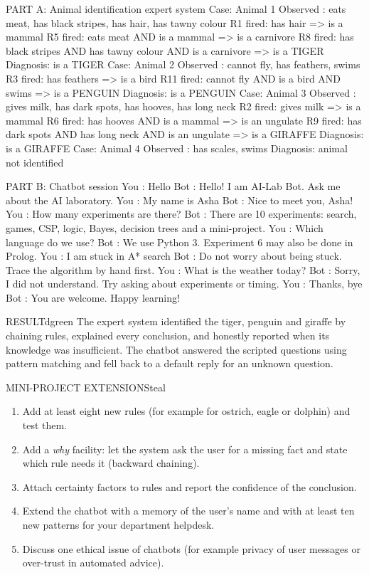 \documentclass[11pt,a4paper]{article}
\newenvironment{result}{\begin{secbox}{RESULT}{dgreen}}{\end{secbox}}
\begin{document}
\begin{outputbox}
PART A: Animal identification expert system
Case: Animal 1
   Observed : eats meat, has black stripes, has hair, has tawny colour
   R1  fired: has hair => is a mammal
   R5  fired: eats meat AND is a mammal => is a carnivore
   R8  fired: has black stripes AND has tawny colour AND is a carnivore => is a TIGER
   Diagnosis: is a TIGER
Case: Animal 2
   Observed : cannot fly, has feathers, swims
   R3  fired: has feathers => is a bird
   R11 fired: cannot fly AND is a bird AND swims => is a PENGUIN
   Diagnosis: is a PENGUIN
Case: Animal 3
   Observed : gives milk, has dark spots, has hooves, has long neck
   R2  fired: gives milk => is a mammal
   R6  fired: has hooves AND is a mammal => is an ungulate
   R9  fired: has dark spots AND has long neck AND is an ungulate => is a GIRAFFE
   Diagnosis: is a GIRAFFE
Case: Animal 4
   Observed : has scales, swims
   Diagnosis: animal not identified

PART B: Chatbot session
   You : Hello
   Bot : Hello! I am AI-Lab Bot. Ask me about the AI laboratory.
   You : My name is Asha
   Bot : Nice to meet you, Asha!
   You : How many experiments are there?
   Bot : There are 10 experiments: search, games, CSP, logic, Bayes, decision trees and a mini-project.
   You : Which language do we use?
   Bot : We use Python 3. Experiment 6 may also be done in Prolog.
   You : I am stuck in A* search
   Bot : Do not worry about being stuck. Trace the algorithm by hand first.
   You : What is the weather today?
   Bot : Sorry, I did not understand. Try asking about experiments or timing.
   You : Thanks, bye
   Bot : You are welcome. Happy learning!
\end{outputbox}

\begin{result}
The expert system identified the tiger, penguin and giraffe by chaining rules, explained every conclusion, and honestly reported when its knowledge was insufficient. The chatbot answered the scripted questions using pattern matching and fell back to a default reply for an unknown question.
\end{result}

\begin{secbox}{MINI-PROJECT EXTENSIONS}{teal}
\begin{enumerate}
  \item Add at least eight new rules (for example for ostrich, eagle or dolphin) and test them.
  \item Add a \emph{why} facility: let the system ask the user for a missing fact and state which rule needs it (backward chaining).
  \item Attach certainty factors to rules and report the confidence of the conclusion.
  \item Extend the chatbot with a memory of the user's name and with at least ten new patterns for your department helpdesk.
  \item Discuss one ethical issue of chatbots (for example privacy of user messages or over-trust in automated advice).
\end{enumerate}
\end{secbox}
\end{document}

